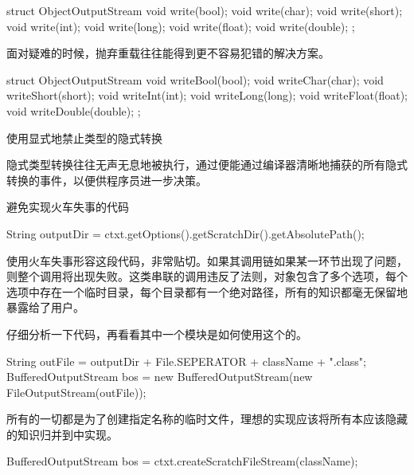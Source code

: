 \begin{content}
\begin{leftbar}
\begin{c++}
struct ObjectOutputStream
{
    void write(bool);
    void write(char);
    void write(short);
    void write(int);
    void write(long);
    void write(float);
    void write(double);
};
\end{c++}
\end{leftbar}

面对疑难的时候，抛弃重载往往能得到更不容易犯错的解决方案。

\begin{leftbar}
\begin{c++}
struct ObjectOutputStream
{
    void writeBool(bool);
    void writeChar(char);
    void writeShort(short);
    void writeInt(int);
    void writeLong(long);
    void writeFloat(float);
    void writeDouble(double);
};
\end{c++}
\end{leftbar}

\begin{regulation}
使用显式地禁止类型的隐式转换
\end{regulation}

隐式类型转换往往无声无息地被执行，通过便能通过编译器清晰地捕获的所有隐式转换的事件，以便供程序员进一步决策。

\begin{regulation}
避免实现火车失事的代码
\end{regulation}

\begin{leftbar}
\begin{java}
String outputDir = ctxt.getOptions().getScratchDir().getAbsolutePath();
\end{java}
\end{leftbar}

使用火车失事形容这段代码，非常贴切。如果其调用链如果某一环节出现了问题，则整个调用将出现失败。这类串联的调用违反了法则，对象包含了多个选项，每个选项中存在一个临时目录，每个目录都有一个绝对路径，所有的知识都毫无保留地暴露给了用户。

仔细分析一下代码，再看看其中一个模块是如何使用这个的。

\begin{leftbar}
\begin{java}
String outFile = outputDir + File.SEPERATOR + className + ".class";
BufferedOutputStream bos = new BufferedOutputStream(new FileOutputStream(outFile));
\end{java}
\end{leftbar}

所有的一切都是为了创建指定名称的临时文件，理想的实现应该将所有本应该隐藏的知识归并到中实现。

\begin{leftbar}
\begin{c++}
BufferedOutputStream bos = ctxt.createScratchFileStream(className);
\end{c++}
\end{leftbar}

\end{content}

